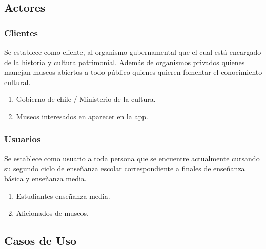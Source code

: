 \newpage
\subsection{Actores}

\subsubsection{Clientes}
Se establece como cliente, al organismo gubernamental que el cual está encargado de la historia y cultura patrimonial. Además de organismos privados quienes manejan museos abiertos a todo público quienes quieren fomentar el conocimiento cultural.

\begin{enumerate}
	\item Gobierno de chile / Ministerio de la cultura.
	\item Museos interesados en aparecer en la app.
\end{enumerate}

\subsubsection{Usuarios}
Se establece como usuario a toda persona que se encuentre actualmente cursando su segundo ciclo de enseñanza escolar correspondiente a finales de enseñanza básica y enseñanza media.

\begin{enumerate}
	\item Estudiantes enseñanza media.
	\item Aficionados de museos.

\end{enumerate}

\subsection{Casos de Uso}

\newpage


\newpage


\newpage


\newpage


\newpage


\newpage


